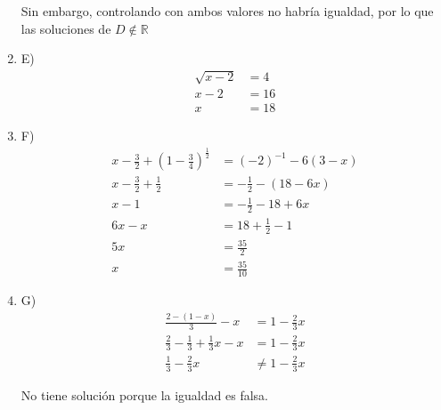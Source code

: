 \begin{enumerate}
	Sin embargo, controlando con ambos valores no habría igualdad, por lo que las soluciones de $D \not\in \mathbb{R}$

	\item[] E)
	\begin{align*}
		\sqrt{x-2} &= 4\\
		x-2 &= 16\\
		x &= 18
	\end{align*}

	\item[] F)
	\begin{align*}
		x - \frac{3}{2} + \left( 1 - \frac{3}{4} \right)^{\frac{1}{2}} &= (-2)^{-1} - 6(3-x)\\
		x - \frac{3}{2} + \frac{1}{2} &= - \frac{1}{2} - (18 - 6x)\\
		x-1 &= - \frac{1}{2} - 18 + 6x\\
		6x-x &= 18 + \frac{1}{2} - 1\\
		5x &= \frac{35}{2}\\
		x &= \frac{35}{10}
	\end{align*}

	\item[] G)
	\begin{align*}
		\frac{2-(1-x)}{3} - x &= 1 - \frac{2}{3} x\\
		\frac{2}{3} - \frac{1}{3} + \frac{1}{3}x - x &= 1 - \frac{2}{3}x\\
		\frac{1}{3} - \frac{2}{3}x &\neq 1 - \frac{2}{3}x
	\end{align*}

	No tiene solución porque la igualdad es falsa.

\end{enumerate}
